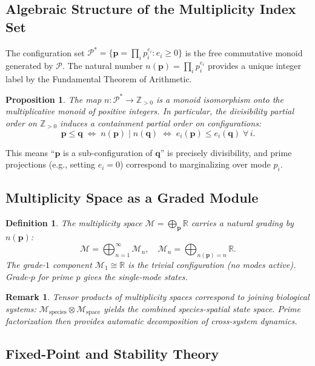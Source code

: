 \documentclass[12pt,letterpaper]{article}
\newtheorem{definition}{Definition}[section]
\newtheorem{proposition}{Proposition}[section]
\newtheorem{remark}{Remark}[section]
\newcommand{\Mcal}{\mathcal{M}}
\newcommand{\Pcal}{\mathcal{P}}
\newcommand{\bp}{\mathbf{p}}
\newcommand{\bq}{\mathbf{q}}
\begin{document}
\subsection{Algebraic Structure of the Multiplicity Index Set}

The configuration set $\Pcal^* = \{\bp = \prod_i p_i^{e_i} : e_i \geq 0\}$
is the free commutative monoid generated by $\Pcal$. The natural number
$n(\bp) = \prod_i p_i^{e_i}$ provides a unique integer label by the
Fundamental Theorem of Arithmetic.

\begin{proposition}
The map $n : \Pcal^* \to \mathbb{Z}_{>0}$ is a monoid isomorphism onto the
multiplicative monoid of positive integers. In particular, the
\emph{divisibility partial order} on $\mathbb{Z}_{>0}$ induces a
\emph{containment partial order} on configurations:
\[
  \bp \leq \bq \;\iff\; n(\bp) \mid n(\bq) \;\iff\;
  e_i(\bp) \leq e_i(\bq)\;\forall\,i.
\]
\end{proposition}

This means ``$\bp$ is a sub-configuration of $\bq$'' is precisely divisibility,
and prime projections (e.g., setting $e_i = 0$) correspond to marginalizing
over mode $p_i$.

\subsection{Multiplicity Space as a Graded Module}

\begin{definition}
The multiplicity space $\Mcal = \bigoplus_{\bp} \mathbb{R}$ carries a natural
grading by $n(\bp)$:
\[
  \Mcal = \bigoplus_{n=1}^\infty \Mcal_n,
  \quad
  \Mcal_n = \bigoplus_{n(\bp)=n} \mathbb{R}.
\]
The grade-$1$ component $\Mcal_1 \cong \mathbb{R}$ is the trivial configuration
(no modes active). Grade-$p$ for prime $p$ gives the single-mode states.
\end{definition}

\begin{remark}
Tensor products of multiplicity spaces correspond to joining biological
systems: $\Mcal_{\text{species}} \otimes \Mcal_{\text{space}}$ yields the
combined species-spatial state space. Prime factorization then provides
automatic decomposition of cross-system dynamics.
\end{remark}

\subsection{Fixed-Point and Stability Theory}
\end{document}
